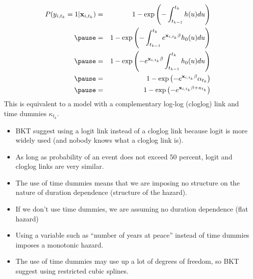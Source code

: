 \documentclass{beamer}
\begin{document}
\begin{frame}
\begin{eqnarray*}
P(y_{i,t_k} = 1 | \mathbf{x}_{i,t_k}) &=& 1 -  \mathrm{exp} \left(
-\int_{t_{k-1}}^{t_k} h(u) du \right) \\
\pause
&=& 1 - \mathrm{exp} \left( -\int_{t_{k-1}}^{t_k} e^{\mathbf{x}_{i, t_k} \beta}
h_0(u) du \right) \\
\pause
&=&  1 - \mathrm{exp} \left( -e^{\mathbf{x}_{i, t_k} \beta}
\int_{t_{k-1}}^{t_k} h_0(u) du \right) \\
\pause
&=&  1 - \mathrm{exp} \left( -e^{\mathbf{x}_{i, t_k} \beta}
\alpha_{t_k} \right) \\
\pause
&=& 1 - \mathrm{exp} \left( -e^{\mathbf{x}_{i, t_k} \beta +
\kappa_{t_k}} \right) \\
\end{eqnarray*}
\pause
This is equivalent to a model with a complementary log-log (cloglog)
link and time dummies $\kappa_{t_k}$.
\end{frame}

\begin{frame}
\begin{itemize}
\item BKT suggest using a logit link instead of a cloglog link because logit
is more widely used (and nobody knows what a cloglog link is).
\pause
\item As long as probability of an event does not exceed 50 percent,
logit and cloglog links are very similar.
\pause
\item The use of time dummies means that we are imposing no
structure on the nature of duration dependence (structure of the hazard).
\pause
\item If we don't use time dummies, we are assuming no duration
dependence (flat hazard)
\pause
\item Using a variable such as ``number of years at peace'' instead of
time dummies imposes a monotonic hazard.
\pause
\item The use of time dummies may use up a lot of degrees of freedom,
so BKT suggest using restricted cubic splines. 
\end{itemize}
\end{frame}
\end{document}
